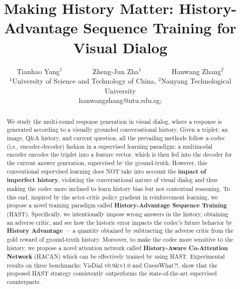 \documentclass[10pt,twocolumn,letterpaper]{article}
\begin{document}
\title{Making History Matter: History-Advantage Sequence Training for Visual Dialog}

\author{Tianhao Yang$^{1}$ ~~~~~~~~Zheng-Jun Zha$^{1}$   ~~~~~~~~Hanwang Zhang$^2$\\
$^1$University of Science and Technology of China,
	$^2$Nanyang Technological University \\
	hanwangzhang@ntu.edu.sg;
}
\maketitle



\begin{abstract}
   We study the multi-round response generation in visual dialog, where a response is generated according to a visually grounded conversational history. Given a triplet: an image, Q\&A history, and current question, all the prevailing methods follow a codec (i.e., encoder-decoder) fashion in a supervised learning paradigm: a multimodal encoder encodes the triplet into a feature vector, which is then fed into the decoder for the current answer generation, supervised by the ground-truth. However, this conventional supervised learning does NOT take into account the \textbf{impact of imperfect history}, violating the conversational nature of visual dialog and thus making the codec more inclined to learn history bias but not contextual reasoning. To this end, inspired by the actor-critic policy gradient in reinforcement learning, we propose a novel training paradigm called \textbf{History-Advantage Sequence Training} (HAST). Specifically, we intentionally impose wrong answers in the history, obtaining an adverse critic, and see how the historic error impacts the codec's future behavior by \textbf{History Advantage} --- a quantity obtained by subtracting the adverse critic from the gold reward of ground-truth history. Moreover, to make the codec more sensitive to the history, we propose a novel attention network called \textbf{History-Aware Co-Attention Network} (HACAN) which can be effectively trained by using HAST. Experimental results on three benchmarks: VisDial v0.9\&v1.0 and GuessWhat?!, show that the proposed HAST strategy consistently outperforms the state-of-the-art supervised counterparts.
\end{abstract}
\end{document}

